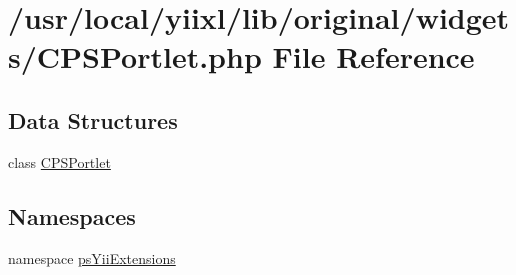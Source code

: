 \hypertarget{CPSPortlet_8php}{
\section{/usr/local/yiixl/lib/original/widgets/CPSPortlet.php File Reference}
\label{CPSPortlet_8php}
}
\subsection*{Data Structures}
\begin{DoxyCompactItemize}
\item 
class \hyperlink{classCPSPortlet}{CPSPortlet}
\end{DoxyCompactItemize}
\subsection*{Namespaces}
\begin{DoxyCompactItemize}
\item 
namespace \hyperlink{namespacepsYiiExtensions}{psYiiExtensions}
\end{DoxyCompactItemize}
